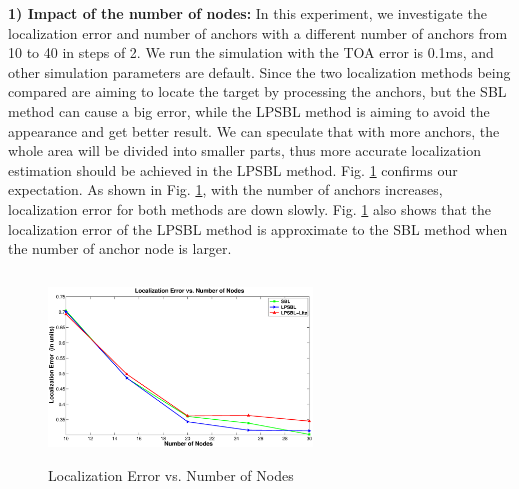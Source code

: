 \textbf{1) Impact of the number of nodes:}
 In this experiment, we investigate the localization error and number of anchors with a different number of anchors from 10 to 40 in steps of 2. 
 We run the simulation with the TOA error is 0.1ms, and other simulation parameters are default. 
 Since the two localization methods being compared are aiming to locate the target by processing the anchors, 
 but the SBL method can cause a big error, while the LPSBL method is aiming to avoid the appearance and get better result. 
 We can speculate that with more anchors, the whole area will be divided into smaller parts, 
 thus more accurate localization estimation should be achieved in the LPSBL method. 
Fig. \ref{fig4} confirms our expectation. As shown in Fig. \ref{fig4}, with the number of anchors increases, localization error for both  methods are down slowly. 
Fig. \ref{fig4} also shows that the localization error of the LPSBL method is approximate to the SBL method when the number of anchor node is larger.
  \begin{figure}[htb]
            \setlength{\abovecaptionskip}{0pt}
            \centering
			 \vspace{-3mm}
           		 \includegraphics[height=5.0cm,width=7.0cm]{image/Nodenumbers.eps}
            \caption{Localization Error vs. Number of Nodes}
             \vspace{-5mm}
             \label{fig4}
        \end{figure}	
		
